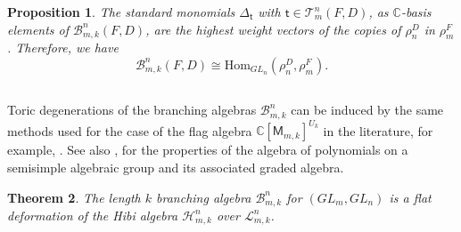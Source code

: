 \documentclass[11pt]{amsart}
\numberwithin{equation}{subsection}
\newtheorem{theorem}{Theorem}[subsection]
\newtheorem{proposition}[theorem]{Proposition}
\begin{document}
\begin{proposition}
The standard monomials $\Delta_{\mathsf{t}}$ with 
$\mathsf{t} \in \mathcal{T}_m^n (F,D)$, as
$\mathbb{C}$-basis elements of $\mathcal{B}_{m,k}^{n}(F,D)$, are the highest weight 
vectors of the copies of $\rho _{n}^{D}$ in $\rho _{m}^{F}$. Therefore, we have
\begin{equation*}
\mathcal{B}_{m,k}^{n}(F,D)\cong \mathrm{Hom}_{{GL}_{n}}
(\rho _{n}^{D}, \rho_{m}^{F}).
\end{equation*}
\end{proposition}

\smallskip

\subsection{}

Toric degenerations of the branching algebras $\mathcal{B}_{m,k}^{n}$ can be
induced by the same methods used for the case of the flag algebra 
$\mathbb{C}[\mathsf{M}_{m,k}]^{U_{k}}$ in the literature, for example, 
\cite{GL96,Ki08,KM05, MS05, St95}. See also \cite[Theorem 1]{Vin95}, for the properties 
of the algebra of polynomials on a semisimple algebraic group and its associated 
graded algebra. 

\begin{theorem}
\label{Deformation}The length $k$ branching algebra $\mathcal{B}_{m,k}^{n}$
for $({GL}_{m},{GL}_{n})$ is a flat deformation of the Hibi algebra 
$\mathcal{H}_{m,k}^{n}$ over $\mathcal{L}_{m,k}^{n}$.
\end{theorem}
\end{document}
